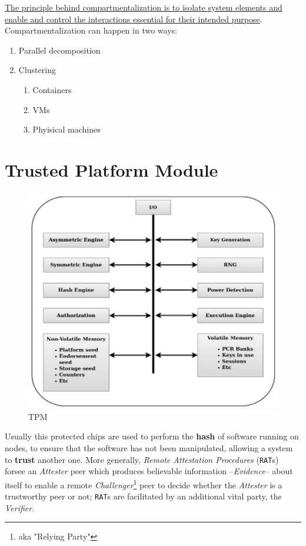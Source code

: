 \ul{The principle behind compartmentalization is to isolate system elements and enable and control the
interactions essential for their intended purpose}.
Compartmentalization can happen in two ways:
\begin{enumerate}
   \item Parallel decomposition
   \item Clustering
   \begin{enumerate}
      \item Containers
      \item VMs
      \item Phyisical machines
   \end{enumerate}
\end{enumerate}

\section{Trusted Platform Module}
\begin{figure}[htbp]
   \centering
   \includegraphics{images/tpm.png}
   \caption{TPM}
   \label{fig:tpm}
\end{figure}

Usually this protected chips are used to perform the \textbf{hash} of software running on nodes,
to ensure that the software has not been manipulated,
allowing a system to \textbf{trust} another one.
More generally, \textit{Remote Attestation Procedures} (\texttt{RAT}s) forsee an \textit{Attester} peer which produces
believable information {--}\textit{Evidence}{--} about itself to enable a remote \textit{Challenger}\footnote{aka "Relying Party"} peer to decide whether the \textit{Attester} is a trustworthy peer
or not;
\texttt{RAT}s are facilitated by an additional vital party, the \textit{Verifier}.


